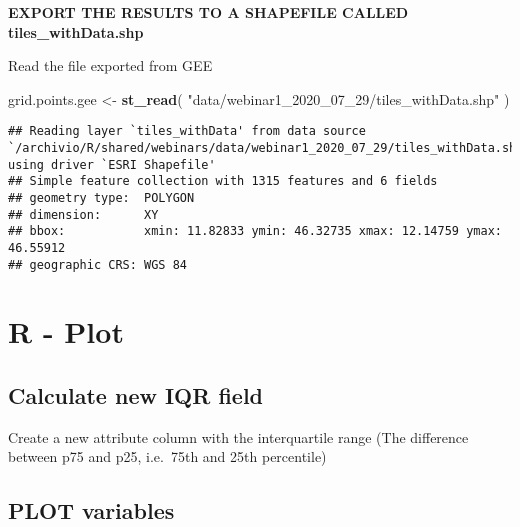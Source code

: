 \documentclass[]{article}
\newenvironment{Shaded}{\begin{snugshade}}{\end{snugshade}}
\newcommand{\KeywordTok}[1]{\textcolor[rgb]{0.13,0.29,0.53}{\textbf{#1}}}
\newcommand{\NormalTok}[1]{#1}
\newcommand{\OperatorTok}[1]{\textcolor[rgb]{0.81,0.36,0.00}{\textbf{#1}}}
\newcommand{\StringTok}[1]{\textcolor[rgb]{0.31,0.60,0.02}{#1}}
\begin{document}
\textbf{EXPORT THE RESULTS TO A SHAPEFILE CALLED tiles\_withData.shp}

Read the file exported from GEE

\begin{Shaded}
\begin{Highlighting}[]
\NormalTok{grid.points.gee <-}\StringTok{ }\KeywordTok{st_read}\NormalTok{( }\StringTok{"data/webinar1_2020_07_29/tiles_withData.shp"}\NormalTok{ )}
\end{Highlighting}
\end{Shaded}

\begin{verbatim}
## Reading layer `tiles_withData' from data source `/archivio/R/shared/webinars/data/webinar1_2020_07_29/tiles_withData.shp' using driver `ESRI Shapefile'
## Simple feature collection with 1315 features and 6 fields
## geometry type:  POLYGON
## dimension:      XY
## bbox:           xmin: 11.82833 ymin: 46.32735 xmax: 12.14759 ymax: 46.55912
## geographic CRS: WGS 84
\end{verbatim}

\hypertarget{r---plot}{%
\section{R - Plot}\label{r---plot}}

\hypertarget{calculate-new-iqr-field}{%
\subsection{Calculate new IQR field}\label{calculate-new-iqr-field}}

Create a new attribute column with the interquartile range (The
difference between p75 and p25, i.e.~75th and 25th percentile)

\begin{Shaded}
\end{Shaded}

\newpage

\hypertarget{plot-variables}{%
\subsection{PLOT variables}\label{plot-variables}}
\end{document}
